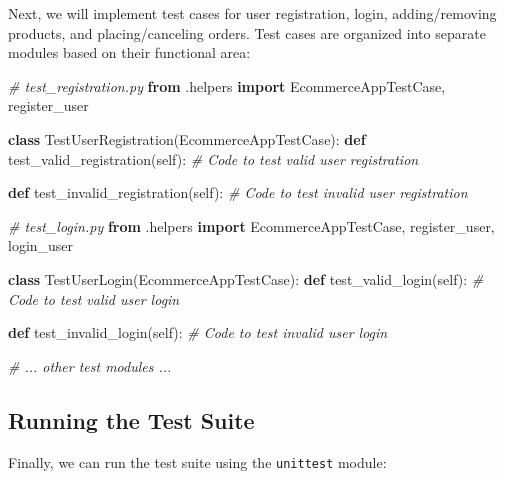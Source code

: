 \documentclass[
  paper=a4,
  ,captions=tableheading
]{scrartcl}
\newenvironment{Shaded}{}{}
\newcommand{\AttributeTok}[1]{\textcolor[rgb]{0.49,0.56,0.16}{#1}}
\newcommand{\CommentTok}[1]{\textcolor[rgb]{0.38,0.63,0.69}{\textit{#1}}}
\newcommand{\ExtensionTok}[1]{#1}
\newcommand{\ImportTok}[1]{\textcolor[rgb]{0.00,0.50,0.00}{\textbf{#1}}}
\newcommand{\KeywordTok}[1]{\textcolor[rgb]{0.00,0.44,0.13}{\textbf{#1}}}
\newcommand{\NormalTok}[1]{#1}
\newcommand{\StringTok}[1]{\textcolor[rgb]{0.25,0.44,0.63}{#1}}
\newcommand{\VariableTok}[1]{\textcolor[rgb]{0.10,0.09,0.49}{#1}}
\begin{document}
Next, we will implement test cases for user registration, login,
adding/removing products, and placing/canceling orders. Test cases are
organized into separate modules based on their functional area:

\begin{Shaded}
\begin{Highlighting}[]
\CommentTok{\# test\_registration.py}
\ImportTok{from}\NormalTok{ .helpers }\ImportTok{import}\NormalTok{ EcommerceAppTestCase, register\_user}

\KeywordTok{class}\NormalTok{ TestUserRegistration(EcommerceAppTestCase):}
    \KeywordTok{def}\NormalTok{ test\_valid\_registration(}\VariableTok{self}\NormalTok{):}
        \CommentTok{\# Code to test valid user registration}

    \KeywordTok{def}\NormalTok{ test\_invalid\_registration(}\VariableTok{self}\NormalTok{):}
        \CommentTok{\# Code to test invalid user registration}

\CommentTok{\# test\_login.py}
\ImportTok{from}\NormalTok{ .helpers }\ImportTok{import}\NormalTok{ EcommerceAppTestCase, register\_user, login\_user}

\KeywordTok{class}\NormalTok{ TestUserLogin(EcommerceAppTestCase):}
    \KeywordTok{def}\NormalTok{ test\_valid\_login(}\VariableTok{self}\NormalTok{):}
        \CommentTok{\# Code to test valid user login}

    \KeywordTok{def}\NormalTok{ test\_invalid\_login(}\VariableTok{self}\NormalTok{):}
        \CommentTok{\# Code to test invalid user login}

\CommentTok{\# ... other test modules ...}
\end{Highlighting}
\end{Shaded}

\hypertarget{running-the-test-suite}{%
\subsection{Running the Test Suite}\label{running-the-test-suite}}

Finally, we can run the test suite using the \texttt{unittest} module:

\begin{Shaded}
\end{Shaded}
\end{document}

